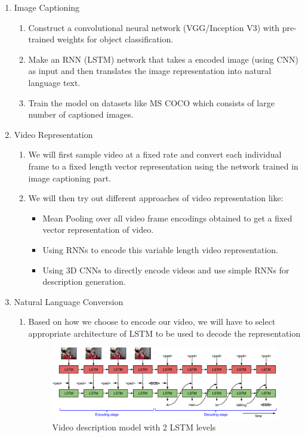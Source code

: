 \documentclass[12pt]{article}
\begin{document}
		\begin{enumerate}
			\item Image Captioning
			\begin{enumerate}
				\item
					Construct a convolutional neural network (VGG/Inception V3) with pre-trained weights for object classification.
				\item
					Make an RNN (LSTM) network\cite{showandtell} that takes a encoded image (using CNN) as input and then translates the image representation into natural language text.
				\item
					Train the model on datasets like MS COCO which consists of large number of captioned images.
			\end{enumerate}
			\item Video Representation
			\begin{enumerate}
				\item
					We will first sample video at a fixed rate and convert each individual frame to a fixed length vector representation using the network trained in image captioning part.
				\item
					We will then try out different approaches of video representation like:
					\begin{itemize}
						\item
							Mean Pooling over all video frame encodings obtained to get a fixed vector representation of video\cite{proposal}.
						\item
							Using RNNs to encode this variable length video representation\cite{s2vt}.
						\item
							Using 3D CNNs to directly encode videos and use simple RNNs for description generation\cite{temporal}.
					\end{itemize}					
			\end{enumerate}
			\item Natural Language Conversion
			\begin{enumerate}
				\item
					Based on how we choose to encode our video, we will have to select appropriate architecture of LSTM to be used to decode the representation
				\begin{figure}[ht!]
				\centering
					\includegraphics[width=10cm]{s2vt.png}
					\caption{Video description model with 2 LSTM levels\label{fig1}}
				\end{figure}


\end{enumerate}
\end{enumerate}
\end{document}
